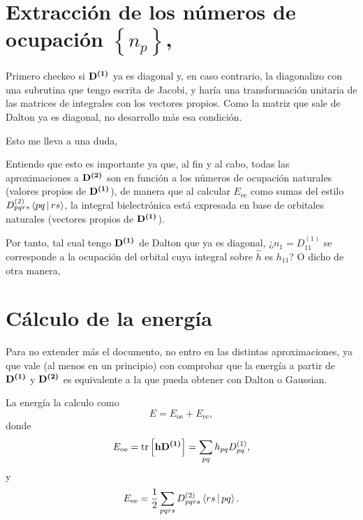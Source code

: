\section{Extracción de los números de ocupación $\left\{ n_p \right\}$, }
Primero checkeo si $\boldsymbol{\mathrm{D^{(1)}}}$ ya es diagonal y, en caso contrario,
la diagonalizo con una subrutina que tengo escrita de Jacobi, y haría una
transformación unitaria de las matrices de integrales con los vectores propios.
Como la matriz que sale de Dalton ya es diagonal, no desarrollo más esa condición.

Esto me lleva a una duda, 

Entiendo que esto es importante ya que, al fin y al cabo, todas las aproximaciones
a $\boldsymbol{\mathrm{D^{(2)}}}$ son en función a los números de ocupación naturales (valores propios
de $\boldsymbol{\mathrm{D^{(1)}}}$), de manera que al calcular $E_{\text{ee}}$ como sumas del estilo
$D^{(2)}_{pqrs} \Braket{pq | rs}$, la integral bielectrónica está expresada
en base de orbitales naturales (vectores propios de $\boldsymbol{\mathrm{D^{(1)}}}$).

Por tanto, tal cual tengo $\boldsymbol{\mathrm{D^{(1)}}}$ de Dalton que ya es diagonal,
¿$n_1 = D^{(1)}_{11}$ se corresponde a la ocupación del orbital cuya integral
sobre $\hat{h}$ es $h_{11}$?
O dicho de otra manera, 

\section{Cálculo de la energía}
Para no extender más el documento, no entro en las distintas aproximaciones,
ya que vale (al menos en un principio) con comprobar que la energía a partir
de $\boldsymbol{\mathrm{D^{(1)}}}$ y $\boldsymbol{\mathrm{D^{(2)}}}$ es equivalente a la que pueda obtener con
Dalton o Gaussian.

La energía la calculo como 
\begin{equation}
    E = E_{\text{oe}} + E_{\text{ee}}
    ,
\end{equation}
donde 
\begin{equation}
    E_{\text{oe}} = 
    \trace \left[ \mat{h} \mat{D^{(1)}} \right] =
    \sum_{pq} h_{pq} D^{(1)}_{pq}
    ,
\end{equation}
y 
\begin{equation}
    E_{\text{ee}} =
    \frac{1}{2} \sum_{pqrs} D^{(2)}_{pqrs} \Braket{rs | pq} 
    .
\end{equation}

